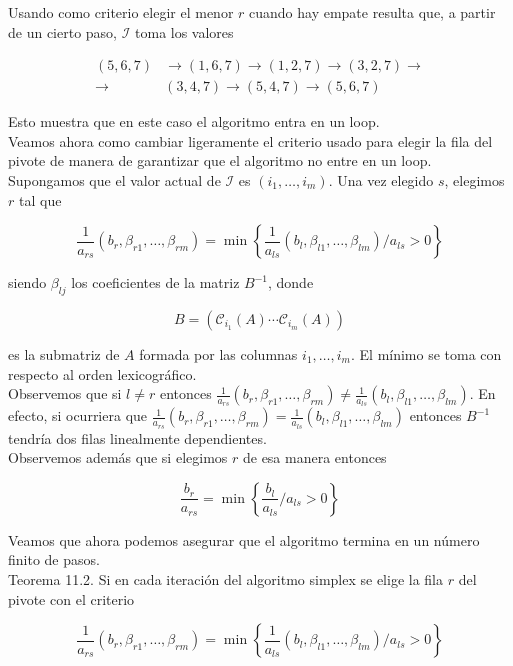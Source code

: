 \documentclass[10pt]{article}
\begin{document}
Usando como criterio elegir el menor $r$ cuando hay empate resulta que, a partir de un cierto paso, $\mathcal{I}$ toma los valores

$$
\begin{aligned}
(5,6,7) & \longrightarrow(1,6,7) \longrightarrow(1,2,7) \longrightarrow(3,2,7) \longrightarrow \\
\longrightarrow & (3,4,7) \longrightarrow(5,4,7) \longrightarrow(5,6,7)
\end{aligned}
$$

Esto muestra que en este caso el algoritmo entra en un loop.\\
Veamos ahora como cambiar ligeramente el criterio usado para elegir la fila del pivote de manera de garantizar que el algoritmo no entre en un loop. Supongamos que el valor actual de $\mathcal{I}$ es $\left(i_{1}, \ldots, i_{m}\right)$. Una vez elegido $s$, elegimos $r$ tal que

$$
\frac{1}{a_{r s}}\left(b_{r}, \beta_{r 1}, \ldots, \beta_{r m}\right)=\min \left\{\frac{1}{a_{l s}}\left(b_{l}, \beta_{l 1}, \ldots, \beta_{l m}\right) / a_{l s}>0\right\}
$$

siendo $\beta_{l j}$ los coeficientes de la matriz $B^{-1}$, donde

$$
B=\left(\mathcal{C}_{i_{1}}(A) \cdots \mathcal{C}_{i_{m}}(A)\right)
$$

es la submatriz de $A$ formada por las columnas $i_{1}, \ldots, i_{m}$. El mínimo se toma con respecto al orden lexicográfico.\\
Observemos que si $l \neq r$ entonces $\frac{1}{a_{r s}}\left(b_{r}, \beta_{r 1}, \ldots, \beta_{r m}\right) \neq \frac{1}{a_{l s}}\left(b_{l}, \beta_{l 1}, \ldots, \beta_{l m}\right)$. En efecto, si ocurriera que $\frac{1}{a_{r s}}\left(b_{r}, \beta_{r 1}, \ldots, \beta_{r m}\right)=\frac{1}{a_{l s}}\left(b_{l}, \beta_{l 1}, \ldots, \beta_{l m}\right)$ entonces $B^{-1}$ tendría dos filas linealmente dependientes.\\
Observemos además que si elegimos $r$ de esa manera entonces

$$
\frac{b_{r}}{a_{r s}}=\min \left\{\frac{b_{l}}{a_{l s}} / a_{l s}>0\right\}
$$

Veamos que ahora podemos asegurar que el algoritmo termina en un número finito de pasos.\\
Teorema 11.2. Si en cada iteración del algoritmo simplex se elige la fila $r$ del pivote con el criterio

$$
\frac{1}{a_{r s}}\left(b_{r}, \beta_{r 1}, \ldots, \beta_{r m}\right)=\min \left\{\frac{1}{a_{l s}}\left(b_{l}, \beta_{l 1}, \ldots, \beta_{l m}\right) / a_{l s}>0\right\}
$$
\end{document}
